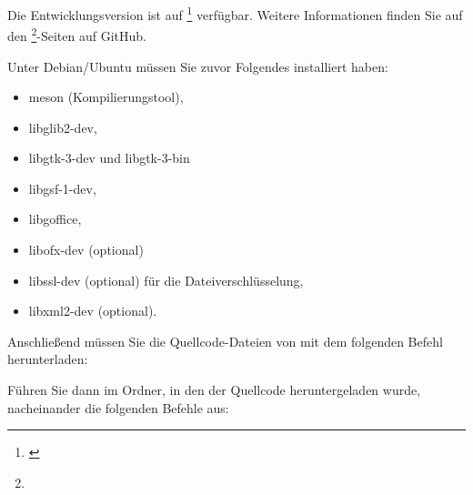Die Entwicklungsversion ist auf \footnote{\label{fn:github}\urlGitHubGrisbi} verfügbar.
Weitere Informationen finden Sie auf den \footnote{\urlGitHubGrisbiWiki}-Seiten auf GitHub.

\noindent
Unter Debian/Ubuntu müssen Sie zuvor Folgendes installiert haben:
\begin{itemize}
	\item  meson (Kompilierungstool),
	\item libglib2-dev,
	\item libgtk-3-dev und libgtk-3-bin
	\item libgsf-1-dev,
	\item libgoffice,
	\item libofx-dev (optional)%
	\item libssl-dev (optional) für die Dateiverschlüsselung,%
	\item libxml2-dev (optional).
\end{itemize}

Anschließend müssen Sie die Quellcode-Dateien von  mit dem folgenden Befehl herunterladen:


Führen Sie dann im Ordner, in den der Quellcode heruntergeladen wurde, nacheinander die folgenden Befehle aus:

